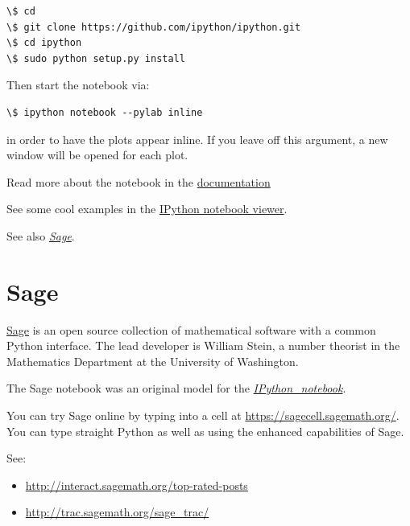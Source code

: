 \documentclass[letterpaper,10pt,english]{sphinxmanual}
\begin{document}
\begin{Verbatim}[commandchars=\\\{\}]
\$ cd
\$ git clone https://github.com/ipython/ipython.git
\$ cd ipython
\$ sudo python setup.py install
\end{Verbatim}

Then start the notebook via:

\begin{Verbatim}[commandchars=\\\{\}]
\$ ipython notebook --pylab inline
\end{Verbatim}

in order to have the plots appear inline.  If you leave off this argument, a
new window will be opened for each plot.

Read more about the notebook in the \href{http://ipython.org/ipython-doc/dev/interactive/htmlnotebook.html}{documentation}

See some cool examples in the \href{http://nbviewer.ipython.org/}{IPython notebook viewer}.

See also {\hyperref[sage:sagemath]{\emph{Sage}}}.


\section{Sage}
\label{sage:sage}\label{sage:sagemath}\label{sage::doc}
\href{http://sagemath.org}{Sage} is an open source collection of mathematical
software with a common Python interface.  The lead developer is William
Stein, a number theorist in the Mathematics Department at the University of
Washington.

The Sage notebook was an original model for the {\hyperref[ipython_notebook:ipython-notebook]{\emph{IPython\_notebook}}}.

You can try Sage online by typing into a cell at
\href{https://sagecell.sagemath.org/}{https://sagecell.sagemath.org/}.  You can type straight
Python as well as using the enhanced capabilities of Sage.

See:
\begin{itemize}
\item {} 
\href{http://interact.sagemath.org/top-rated-posts}{http://interact.sagemath.org/top-rated-posts}

\item {} 
\href{http://trac.sagemath.org/sage\_trac/}{http://trac.sagemath.org/sage\_trac/}

\end{itemize}
\end{document}
